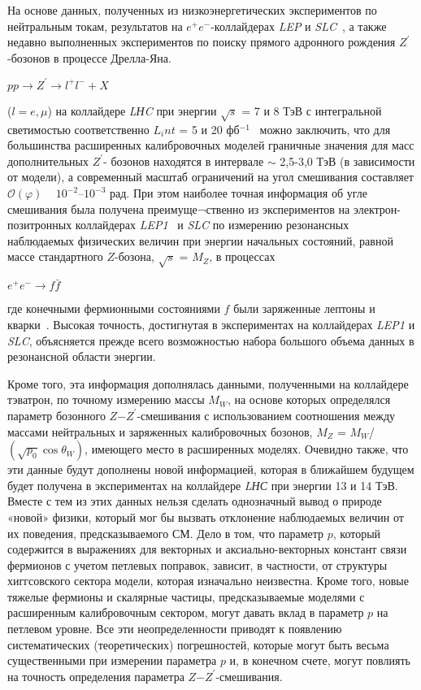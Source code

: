 На основе данных, полученных из низкоэнергетических экспериментов по нейтральным токам, результатов на $e^+e^-$-коллайдерах \textit{LEP} и \textit{SLC}~\cite{Bobovnikov:2016}, а также недавно выполненных экспериментов по поиску прямого адронного рождения $Z^\prime$-бозонов в процессе Дрелла-Яна.
\begin{center}
	$pp \rightarrow Z^\prime \rightarrow l^+l^- + X$
\end{center}
($l=e,\mu$) на коллайдере \textit{LНC} при энергии $\sqrt{s}$ = 7 и 8 ТэВ с интегральной светимостью соответственно $L_int$ = 5 и 20 фб${}^{-1}$~\cite{Bobovnikov:2016} можно заключить, что для большинства расширенных калибровочных моделей граничные значения для масс дополнительных $Z^\prime$- бозонов находятся в интервале $\sim$ 2,5-3,0 ТэВ (в зависимости от модели), а современный масштаб ограничений на угол смешивания составляет $\mathcal{O}(\varphi )$ ~ ${10}^{-2}$--${10}^{-3}$ рад. При этом наиболее точная информация об угле смешивания была получена преимуще¬ственно из экспериментов на электрон-позитронных коллайдерах \textit{LEP1}~\cite{schael:2006} и \textit{SLC} по измерению резонансных наблюдаемых физических величин при энергии начальных состояний, равной массе стандартного $Z$-бозона, $\sqrt{s}$ = $M_Z$, в процессах
\begin{center}
	$e^+e^- \rightarrow f\bar{f}$
\end{center}

где конечными фермионными состояниями $f$ были заряженные лептоны и кварки~\cite{andreev-pankov:2012}. Высокая точность, достигнутая в экспериментах на коллайдерах \textit{LEP1} и \textit{SLC}, объясняется прежде всего возможностью набора большого объема данных в резонансной области энергии.

Кроме того, эта информация дополнялась данными, полученными на коллайдере тэватрон, по точному измерению массы $M_W$, на основе которых определялся параметр бозонного $Z$−$Z^\prime$-смешивания с использованием соотношения между массами нейтральных и заряженных калибровочных бозонов, $M_Z$ = $M_W$/$(\sqrt{p_0}\cos\theta_W)$, имеющего место в расширенных моделях. Очевидно также, что эти данные будут дополнены новой информацией, которая в ближайшем будущем будет получена в экспериментах на коллайдере \textit{LНС} при энергии 13 и 14 ТэВ. Вместе с тем из этих данных нельзя сделать однозначный вывод о природе «новой» физики, который мог бы вызвать отклонение наблюдаемых величин от их поведения, предсказываемого СМ. Дело в том, что параметр $p$, который содержится в выражениях для векторных и аксиально-векторных констант связи фермионов с учетом петлевых поправок, зависит, в частности, от структуры хиггсовского сектора модели, которая изначально неизвестна. Кроме того, новые тяжелые фермионы и скалярные частицы, предсказываемые моделями с расширенным калибровочным сектором, могут давать вклад в параметр $p$ на петлевом уровне. Все эти неопределенности приводят к появлению систематических (теоретических) погрешностей, которые могут быть весьма существенными при измерении параметра $p$ и, в конечном счете, могут повлиять на точность определения параметра $Z$−$Z^\prime$-смешивания.

